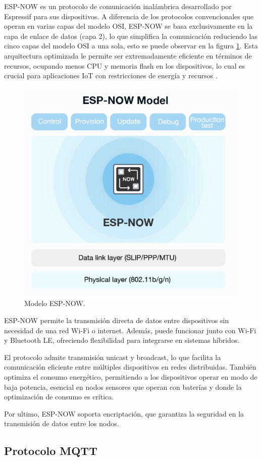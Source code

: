 ESP-NOW es un protocolo de comunicación inalámbrica desarrollado por Espressif para sus dispositivos. A diferencia de los protocolos convencionales que operan en varias capas del modelo OSI, ESP-NOW se basa exclusivamente en la capa de enlace de datos (capa 2), lo que simplifica la comunicación reduciendo las cinco capas del modelo OSI a una sola, esto se puede observar en la figura \ref{fig:espnow}. Esta arquitectura optimizada le permite ser extremadamente eficiente en términos de recursos, ocupando menos CPU y memoria flash en los dispositivos, lo cual es crucial para aplicaciones IoT con restricciones de energía y recursos \citep{espnow}.

\begin{figure}[H]
    \centering
    \includegraphics[width=.6\textwidth]{./Figures/espnow.png}
    \caption{Modelo ESP-NOW.}
    \label{fig:espnow}
\end{figure}

ESP-NOW permite la transmisión directa de datos entre dispositivos sin necesidad de una red Wi-Fi o internet. Además, puede funcionar junto con Wi-Fi y Bluetooth LE, ofreciendo flexibilidad para integrarse en sistemas híbridos.

El protocolo admite transmisión unicast y broadcast, lo que facilita la comunicación eficiente entre múltiples dispositivos en redes distribuidas. También optimiza el consumo energético, permitiendo a los dispositivos operar en modo de baja potencia, esencial en nodos sensores que operan con baterías y donde la optimización de consumo es crítica.

Por ultimo, ESP-NOW soporta encriptación, que garantiza la seguridad en la transmisión de datos entre los nodos.

\subsection{Protocolo MQTT}


